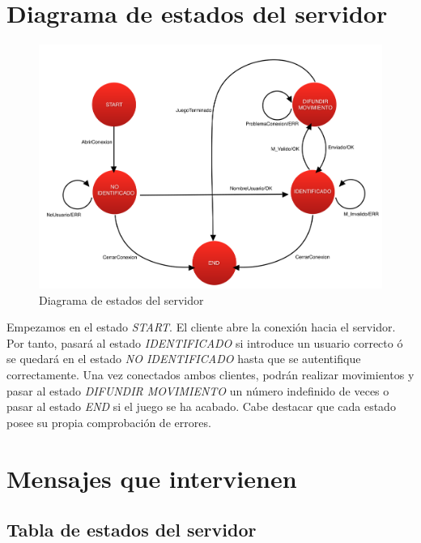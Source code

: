 	
	
\section{Diagrama de estados del servidor}

\begin{figure}[h]
	\centering
	\includegraphics[width=.8\textwidth]{img/1}
	\caption{Diagrama de estados del servidor}
\end{figure}
	

Empezamos en el estado \textit{START}. El cliente abre la conexión hacia el servidor. Por tanto, pasará al estado \textit{IDENTIFICADO} si introduce un usuario correcto ó se quedará en el estado \textit{NO IDENTIFICADO} hasta que se autentifique correctamente. Una vez conectados ambos clientes, podrán realizar movimientos y pasar al estado \textit{DIFUNDIR MOVIMIENTO} un número indefinido de veces o pasar al estado \textit{END} si el juego se ha acabado. Cabe destacar que cada estado posee su propia comprobación de errores. \\














\newpage

\section{Mensajes que intervienen}

\subsection{Tabla de estados del servidor}

